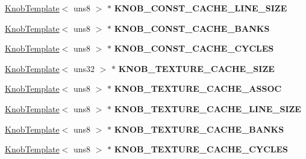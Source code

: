 \begin{DoxyCompactItemize}
\item 
\hypertarget{classall__knobs__c_a71202c4ce874f2f5b4a2d09bb9c6273c}{
\hyperlink{classKnobTemplate}{KnobTemplate}$<$ uns8 $>$ $\ast$ {\bfseries KNOB\_\-CONST\_\-CACHE\_\-LINE\_\-SIZE}}
\label{classall__knobs__c_a71202c4ce874f2f5b4a2d09bb9c6273c}

\item 
\hypertarget{classall__knobs__c_a967551894ebde7ca493aec2933d95ae1}{
\hyperlink{classKnobTemplate}{KnobTemplate}$<$ uns8 $>$ $\ast$ {\bfseries KNOB\_\-CONST\_\-CACHE\_\-BANKS}}
\label{classall__knobs__c_a967551894ebde7ca493aec2933d95ae1}

\item 
\hypertarget{classall__knobs__c_a54f272deb70ea013886ed05cf5bdf1de}{
\hyperlink{classKnobTemplate}{KnobTemplate}$<$ uns8 $>$ $\ast$ {\bfseries KNOB\_\-CONST\_\-CACHE\_\-CYCLES}}
\label{classall__knobs__c_a54f272deb70ea013886ed05cf5bdf1de}

\item 
\hypertarget{classall__knobs__c_ad4abce6bc90ff8cf09d2f8e5212fc5fe}{
\hyperlink{classKnobTemplate}{KnobTemplate}$<$ uns32 $>$ $\ast$ {\bfseries KNOB\_\-TEXTURE\_\-CACHE\_\-SIZE}}
\label{classall__knobs__c_ad4abce6bc90ff8cf09d2f8e5212fc5fe}

\item 
\hypertarget{classall__knobs__c_afcdbba60c79b05b4d582ea7d5bb623b2}{
\hyperlink{classKnobTemplate}{KnobTemplate}$<$ uns8 $>$ $\ast$ {\bfseries KNOB\_\-TEXTURE\_\-CACHE\_\-ASSOC}}
\label{classall__knobs__c_afcdbba60c79b05b4d582ea7d5bb623b2}

\item 
\hypertarget{classall__knobs__c_a3c2c3561dba02b2728a9e45d4ec7d2d6}{
\hyperlink{classKnobTemplate}{KnobTemplate}$<$ uns8 $>$ $\ast$ {\bfseries KNOB\_\-TEXTURE\_\-CACHE\_\-LINE\_\-SIZE}}
\label{classall__knobs__c_a3c2c3561dba02b2728a9e45d4ec7d2d6}

\item 
\hypertarget{classall__knobs__c_ac82bdda87f4e9a494eae4e429158a9de}{
\hyperlink{classKnobTemplate}{KnobTemplate}$<$ uns8 $>$ $\ast$ {\bfseries KNOB\_\-TEXTURE\_\-CACHE\_\-BANKS}}
\label{classall__knobs__c_ac82bdda87f4e9a494eae4e429158a9de}

\item 
\hypertarget{classall__knobs__c_a76cbbdc15cf3755c697ce6d7da994ff7}{
\hyperlink{classKnobTemplate}{KnobTemplate}$<$ uns8 $>$ $\ast$ {\bfseries KNOB\_\-TEXTURE\_\-CACHE\_\-CYCLES}}
\label{classall__knobs__c_a76cbbdc15cf3755c697ce6d7da994ff7}


\end{DoxyCompactItemize}

